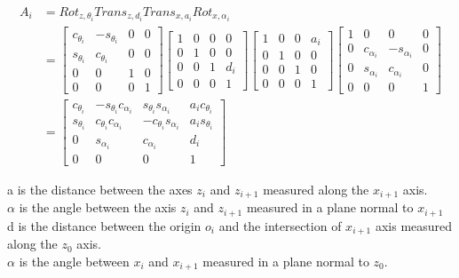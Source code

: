 \begin{equation}
\begin{split}
A_i  & = Rot_{z,\theta_{i}}Trans_{z,d_{i}}Trans_{x,a_{i}}Rot_{x,\alpha_{i}} \\
     & = \begin{bmatrix}c_{\theta_{i}} & -s_{\theta_{i}} & 0 & 0 \\ s_{\theta_{i}} & c_{\theta_{i}} & 0 & 0\\  0 &0 & 1 &0 \\ 0 &0&0& 1\end{bmatrix} 
      \begin{bmatrix}1 &0& 0& 0\\ 0& 1& 0& 0\\ 0& 0& 1& d_{i}\\ 0& 0& 0& 1\end{bmatrix} 
      \begin{bmatrix} 1 & 0 &0& a_{i}\\ 0& 1& 0 &0\\ 0 &0 &1& 0\\ 0 &0& 0 &1\end{bmatrix}
      \begin{bmatrix}1& 0& 0& 0\\0& c_{\alpha_{i}}& -s_{\alpha_{i}} & 0\\ 0 & s_{\alpha_{i}} & c_{\alpha_{i}} & 0\\ 0& 0 &0& 1 \end{bmatrix}\\
     & = \begin{bmatrix}c_{\theta_i}& -s_{\theta_i}c_{\alpha_i}& s_{\theta_i}s_{\alpha_i}& a_{i}c_{\theta_i}\\ s_{\theta_i}& c_{\theta_i}c_{\alpha_i} & -c_{\theta_i}s_{\alpha_i}& a_{i}s_{\theta_i}\\ 0 & s_{\alpha_i}& c_{\alpha_i} & d_{i}\\ 0& 0& 0& 1\end{bmatrix}
\end{split}
\end{equation}

a is the distance between the axes $z_i$ and $z_{i+1}$ measured along the $x_{i+1}$ axis.\\
$\alpha$ is the angle between the axis $z_i$ and $z_{i+1}$ measured in a plane normal to $x_{i+1}$\\
d is the distance between the origin $o_i$ and the intersection of $x_{i+1}$ axis measured along the $z_0$ axis.\\
$\alpha$ is the angle between $x_i$ and $x_{i+1}$ measured in a plane normal to $z_0$.








